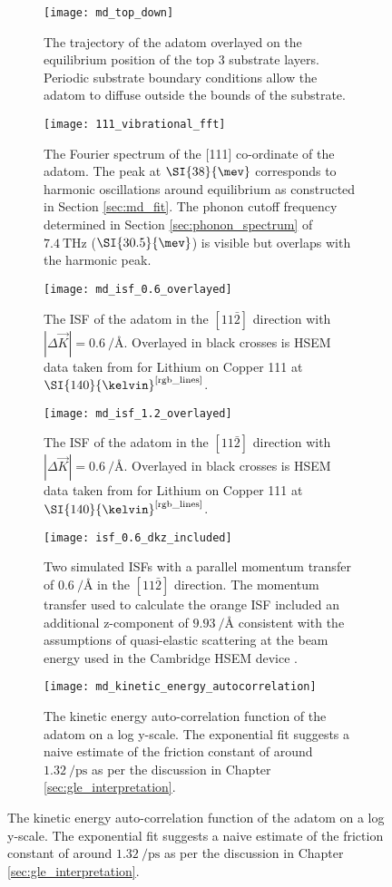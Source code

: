 \begin{figure}
	\begin{subfigure}{0.49\textwidth}
		\texttt{[image: md\_top\_down]}
		\caption{The trajectory of the adatom overlayed on the equilibrium position of the top 3 substrate layers. Periodic substrate boundary conditions allow the adatom to diffuse outside the bounds of the substrate.}
		\label{fig:md_top_down}
	\end{subfigure}
	\hfill
	\begin{subfigure}{0.49\textwidth}
		\texttt{[image: 111\_vibrational\_fft]}
		\caption{The Fourier spectrum of the [111] co-ordinate of the adatom. The peak at $\SI{38}{\mev}$ corresponds to harmonic oscillations around equilibrium as constructed in Section \ref{sec:md_fit}. The phonon cutoff frequency determined in Section \ref{sec:phonon_spectrum} of $\SI{7.4}{\tera\hertz}$ ($\SI{30.5}{\mev}$) is visible but overlaps with the harmonic peak.}
		\label{fig:111_vibrational_fft}
	\end{subfigure}
	
	\begin{subfigure}{0.49\textwidth}
		\texttt{[image: md\_isf\_0.6\_overlayed]}
		\caption{The ISF of the adatom in the $\left[11\bar{2}\right]$ direction with $\left|\Delta{\vec{K}}\right|=\SI{0.6}{\per\angstrom}$. Overlayed in black crosses is HSEM data taken from \cite{Ward} for Lithium on Copper 111 at $\SI{140}{\kelvin}^{\text{\ref{rgb_lines}}}$.}
		\label{fig:md_isf_0.6}
	\end{subfigure}
	\hfill
	\begin{subfigure}{0.49\textwidth}
		\texttt{[image: md\_isf\_1.2\_overlayed]}
		\caption{The ISF of the adatom in the $\left[11\bar{2}\right]$ direction with $\left|\Delta{\vec{K}}\right|=\SI{0.6}{\per\angstrom}$. Overlayed in black crosses is HSEM data taken from \cite{Ward} for Lithium on Copper 111 at $\SI{140}{\kelvin}^{\text{\ref{rgb_lines}}}$.}
		\label{fig:md_isf_1.2}
	\end{subfigure}

	\begin{subfigure}{0.49\textwidth}
		\texttt{[image: isf\_0.6\_dkz\_included]}
		\caption{Two simulated ISFs with a parallel momentum transfer of $\SI{0.6}{\per\angstrom}$ in the $\left[11\bar{2}\right]$ direction. The momentum transfer used to calculate the orange ISF included an additional z-component of $\SI{9.93}{\per\angstrom}$ consistent with the assumptions of quasi-elastic scattering at the beam energy used in the Cambridge HSEM device \cite{HSEM}.}
		\label{fig:isf_0.6_dkz_included}
	\end{subfigure}
	\hfill
	\begin{subfigure}{0.49\textwidth}
		\texttt{[image: md\_kinetic\_energy\_autocorrelation]}
		\caption{The kinetic energy auto-correlation function of the adatom on a log y-scale. The exponential fit suggests a naive estimate of the friction constant of around $\SI{1.32}{\per\pico\second}$ as per the discussion in Chapter \ref{sec:gle_interpretation}.}
		\label{fig:md_kinetic_energy_autocorrelation}
	\end{subfigure}
	

\end{figure}
